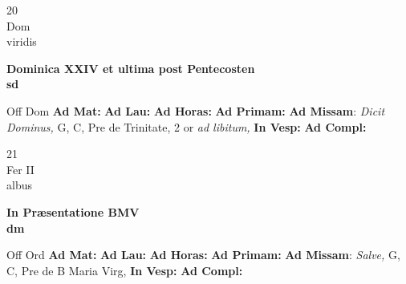 \documentclass[10pt, openany]{book}
\begin{document}
    \begin{center}
        \begin{minipage}{3.5in}
            \vspace{2em}
            \begin{minipage}{0.5in}
                {\Huge 20} \\
                {\normalsize Dom} \\
                {\normalsize viridis}
            \end{minipage}
            \begin{minipage}{3.0in}
                \textbf{ \large Dominica XXIV et ultima post Pentecosten \\
                \textnormal{\normalsize sd}} \\ 
            \end{minipage}
            \begin{justify}Off Dom
                \textbf{Ad Mat: }
                \textbf{Ad Lau: }
                \textbf{Ad Horas: }
                \textbf{Ad Primam: }\textbf{Ad Missam}: \textit{Dicit Dominus,} G, C, Pre de Trinitate, 2 or \textit{ad libitum,}  
                \textbf{In Vesp: }
                \textbf{Ad Compl: }
            \end{justify}
        \end{minipage}
    \end{center}

    \begin{center}
        \begin{minipage}{3.5in}
            \vspace{2em}
            \begin{minipage}{0.5in}
                {\Huge 21} \\
                {\normalsize Fer II} \\
                {\normalsize albus}
            \end{minipage}
            \begin{minipage}{3.0in}
                \textbf{ \large In Præsentatione BMV \\
                \textnormal{\normalsize dm}} \\ 
            \end{minipage}
            \begin{justify}Off Ord
                \textbf{Ad Mat: }
                \textbf{Ad Lau: }
                \textbf{Ad Horas: }
                \textbf{Ad Primam: }\textbf{Ad Missam}: \textit{Salve,} G, C, Pre de B Maria Virg,  
                \textbf{In Vesp: }
                \textbf{Ad Compl: }
            \end{justify}
        \end{minipage}
    \end{center}
\end{document}
